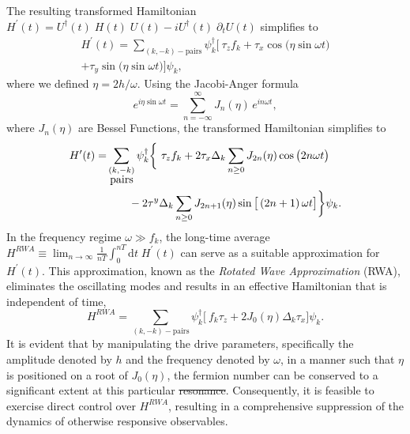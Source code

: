 \documentclass[%
reprint,
superscriptaddress,
amsmath,amssymb,
aps,
prb,
showkeys,
]{revtex4-2}
\providecommand{\DIFaddtex}[1]{{\protect\color{blue}\uwave{#1}}} %
\providecommand{\DIFdeltex}[1]{{\protect\color{red}\sout{#1}}}                      %
\providecommand{\DIFaddbegin}{} %
\providecommand{\DIFaddend}{} %
\providecommand{\DIFdelbegin}{} %
\providecommand{\DIFdelend}{} %
\providecommand{\DIFadd}[1]{\texorpdfstring{\DIFaddtex{#1}}{#1}} %
\providecommand{\DIFdel}[1]{\texorpdfstring{\DIFdeltex{#1}}{}} %
\newcommand{\DIFscaledelfig}{0.5}
\newlength{\DIFdelgraphicswidth} %
\newlength{\DIFdelgraphicsheight} %
\newcommand{\DIFaddincludegraphics}[2][]{{\color{blue}\fbox{\DIFOincludegraphics[#1]{#2}}}} %
\newcommand{\DIFdelincludegraphics}[2][]{%
\sbox{\DIFdelgraphicsbox}{\DIFOincludegraphics[#1]{#2}}%
\settoboxwidth{\DIFdelgraphicswidth}{\DIFdelgraphicsbox} %
\settoboxtotalheight{\DIFdelgraphicsheight}{\DIFdelgraphicsbox} %
\scalebox{\DIFscaledelfig}{%
\parbox[b]{\DIFdelgraphicswidth}{\usebox{\DIFdelgraphicsbox}\\[-\baselineskip] \rule{\DIFdelgraphicswidth}{0em}}\llap{\resizebox{\DIFdelgraphicswidth}{\DIFdelgraphicsheight}{%
\setlength{\unitlength}{\DIFdelgraphicswidth}%
\begin{picture}(1,1)%
\thicklines\linethickness{2pt} %
{\color[rgb]{1,0,0}\put(0,0){\framebox(1,1){}}}%
{\color[rgb]{1,0,0}\put(0,0){\line( 1,1){1}}}%
{\color[rgb]{1,0,0}\put(0,1){\line(1,-1){1}}}%
\end{picture}%
}\hspace*{3pt}}} %
} %
\DeclareRobustCommand{\DIFaddbegin}{\DIFOaddbegin \let\includegraphics\DIFaddincludegraphics} %
\DeclareRobustCommand{\DIFaddend}{\DIFOaddend \let\includegraphics\DIFOincludegraphics} %
\DeclareRobustCommand{\DIFdelbegin}{\DIFOdelbegin \let\includegraphics\DIFdelincludegraphics} %
\DeclareRobustCommand{\DIFdelend}{\DIFOaddend \let\includegraphics\DIFOincludegraphics} %
\begin{document}
The resulting transformed Hamiltonian $H^\prime(t) = U^\dagger(t)\;H(t)\;U(t)-iU^\dagger(t)\;\partial_tU(t)$ simplifies to
\begin{multline}
	\label{eq:rotated:tfim}
	H^\prime(t) = \sum_{(k,-k)-\mbox{pairs}} \psi^\dagger_k
	\bigg[\ \tau_z f_k + \tau_x \cos{\big(\eta\sin{\omega t}\big)}  \\
	+ \tau_y \sin{\big(\eta\sin{\omega t}\big)}\bigg]\psi_k,
\end{multline}
where we defined $\eta=2h/\omega$. Using the Jacobi-Anger formula~\cite{arfkenmath}
\begin{equation}
	\label{eq:jacobi}
	e^{i \eta \sin{\omega t}} = \displaystyle\sum_{n=-\infty}^{\infty} J_n(\eta)\, e^{i n \omega t},
\end{equation} 
where $J_n(\eta)$ are Bessel Functions, the transformed Hamiltonian simplifies to \\
\begin{align}
	H^\prime(t) =& \sum_{\substack{(k,-k) \\ \mbox{pairs}}} \psi^\dagger_k
	\bigg\{\ \tau_z f_k + 2\tau_x \Delta_k \sum_{n\geq 0} J_{2n}(\eta)\cos{\big(2n\omega t\big)} \nonumber\\
	&\hskip 0.7cm- 2\tau^y\Delta_k \sum_{n\geq 0} J_{2n+1}(\eta)\sin{\big[\left(2n+1\right)\omega t\big]}   \bigg\}\psi_k.
\end{align}
In the frequency regime  $\omega \gg f_k$, the long-time average $H^{RWA}\equiv\displaystyle\lim_{n\rightarrow\infty}\frac{1}{nT}\int^{nT}_0\mathrm{d}t\;H^\prime(t)$ can serve as a suitable approximation for $H^\prime(t)$. This approximation, known as the \emph{Rotated Wave Approximation} (RWA), eliminates the oscillating modes and results in an effective Hamiltonian that is independent of time,
\begin{equation}
	\label{eq:hrwa:tfim}
	H^{RWA} = \sum_{(k,-k)-\mbox{pairs}} \psi^\dagger_k
	\bigg[\ f_k\tau_z + 2 J_0(\eta) \Delta_k\tau_x \bigg]\psi_k.
\end{equation}
It is evident that by manipulating the drive parameters, specifically the amplitude denoted by $h$ and the frequency denoted by $\omega$, in a manner such that $\eta$ is positioned on a root of $J_0(\eta)$, the fermion number can be conserved to a significant extent at this particular \DIFdelbegin \DIFdel{resonance}\DIFdelend \DIFaddbegin \DIFadd{point}\DIFaddend . Consequently, it is feasible to exercise direct control over $H^{RWA}$, resulting in a comprehensive suppression of the dynamics of otherwise responsive observables.
\end{document}
